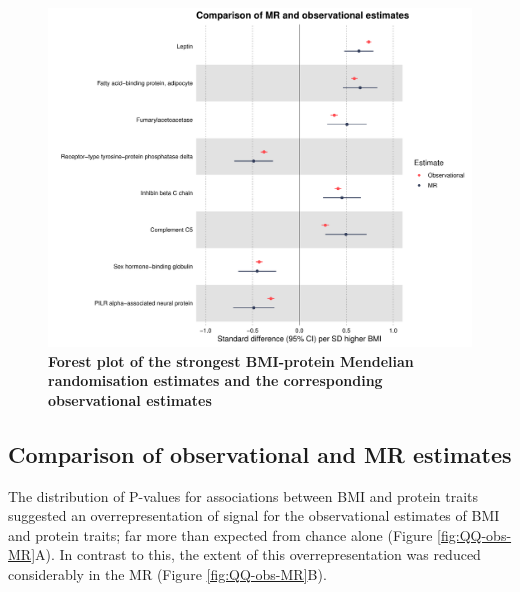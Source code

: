 \documentclass[11pt,twoside]{bristolthesis}
\begin{document}
\begin{figure}
\includegraphics[width=0.95\linewidth]{figure/BMI_protein_INTERVAL/MR_obs_compar_forestplot} \caption[Forest plot of the strongest BMI-protein Mendelian randomisation estimates and the corresponding observational estimates]{\textbf{Forest plot of the strongest BMI-protein Mendelian randomisation estimates and the corresponding observational estimates}}\label{fig:ObsMRforestplot2}
\end{figure}
\hypertarget{comparison-of-observational-and-mr-estimates}{%
\subsection{Comparison of observational and MR estimates}\label{comparison-of-observational-and-mr-estimates}}

The distribution of P-values for associations between BMI and protein traits suggested an overrepresentation of signal for the observational estimates of BMI and protein traits; far more than expected from chance alone (Figure \ref{fig:QQ-obs-MR}A). In contrast to this, the extent of this overrepresentation was reduced considerably in the MR (Figure \ref{fig:QQ-obs-MR}B).
\end{document}
